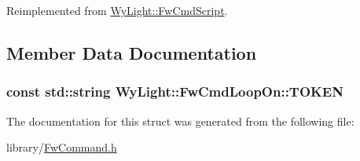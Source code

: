 Reimplemented from \hyperlink{class_wy_light_1_1_fw_cmd_script_ad7b0c30c6787466057b109c5a5bba6b6}{Wy\-Light\-::\-Fw\-Cmd\-Script}.



\subsection{Member Data Documentation}
\hypertarget{struct_wy_light_1_1_fw_cmd_loop_on_a58017e94f9a612a0288a010729a8e4cb}{
\subsubsection[{T\-O\-K\-E\-N}]{\setlength{\rightskip}{0pt plus 5cm}const std\-::string Wy\-Light\-::\-Fw\-Cmd\-Loop\-On\-::\-T\-O\-K\-E\-N\hspace{0.3cm}{\ttfamily [static]}}}\label{struct_wy_light_1_1_fw_cmd_loop_on_a58017e94f9a612a0288a010729a8e4cb}


The documentation for this struct was generated from the following file\-:\begin{DoxyCompactItemize}
\item 
library/\hyperlink{_fw_command_8h}{Fw\-Command.\-h}\end{DoxyCompactItemize}
